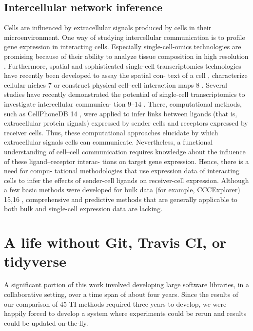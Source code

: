\subsection{Intercellular network inference}
Cells are influenced by extracellular signals produced by cells
in their microenvironment. One way of studying intercellular
communication is to profile gene expression in interacting cells.
Especially single-cell-omics technologies are promising because
of their ability to analyze tissue composition in high resolution \cite{yosef_writlargegenomic_2016,tanay_scalingsinglecellgenomics_2017} .
Furthermore, spatial and sophisticated single-cell transcriptomics
technologies have recently been developed to assay the spatial con-
text of a cell \cite{stahl_visualizationanalysisgene_2016,rodriques_slideseqscalabletechnology_2019,eng_transcriptomescalesuperresolvedimaging_2019,vickovic_highdefinitionspatialtranscriptomics_2019} , characterize cellular niches 7 or construct physical
cell–cell interaction maps 8 .
Several studies have recently demonstrated the potential of
single-cell transcriptomics to investigate intercellular communica-
tion 9–14 . There, computational methods, such as CellPhoneDB 14 ,
were applied to infer links between ligands (that is, extracellular
protein signals) expressed by sender cells and receptors expressed
by receiver cells. Thus, these computational approaches elucidate
by which extracellular signals cells can communicate. Nevertheless,
a functional understanding of cell–cell communication requires
knowledge about the influence of these ligand–receptor interac-
tions on target gene expression. Hence, there is a need for compu-
tational methodologies that use expression data of interacting cells
to infer the effects of sender-cell ligands on receiver-cell expression.
Although a few basic methods were developed for bulk data (for
example, CCCExplorer) 15,16 , comprehensive and predictive methods
that are generally applicable to both bulk and single-cell expression
data are lacking.





\section{A life without Git, Travis CI, or tidyverse}
A significant portion of this work involved developing large software libraries, in a collaborative setting, over a time span of about four years. Since the results of our comparison of 45 TI methods required three years to develop, we were happily forced to develop a system where experiments could be rerun and results could be updated on-the-fly.

